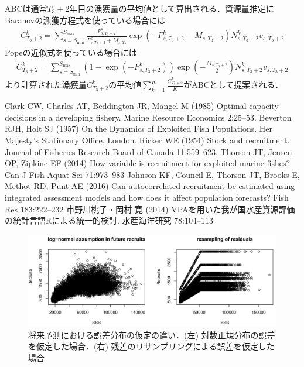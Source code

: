 \documentclass[11pt]{jsarticle}
\begin{document}
ABCは通常$T_{3}+2$年目の漁獲量の平均値として算出される．資源量推定にBaranovの漁獲方程式を使っている場合には
\begin{eqnarray}
  C_{T_3+2}^k=\sum_{s=S_{\mathrm{min}}}^{S_{\mathrm{max}}} \frac{F_{s,T_3+2}^k}{F_{s,T_3+2}^k+M_{s,T_4}}
  \exp(- F_{s,T_3+2}^k-M_{s,T_3+2}) N_{s,T_3+2}^k v_{s,T_3+2}
\end{eqnarray}
Popeの近似式を使っている場合には
\begin{eqnarray}
  C_{T_3+2}^k=\sum_{s=S_{\mathrm{min}}}^{S_{\mathrm{max}}} (1-\exp(- F_{s,T_3+2}^k)) \exp(-\frac{M_{s,T_3+2}}{2}) N_{s,T_3+2}^k v_{s,T_3+2} 
\end{eqnarray}
より計算された漁獲量$C_{T_3+2}^k$の平均値$\sum_{k=1}^K \frac{C_{T_3+2}^k}{K}$がABCとして提案される．

\begin{thebibliography}{9}
   Clark CW, Charles AT, Beddington JR, Mangel M (1985) Optimal capacity decisions in a developing fishery. Marine Resource Economics 2:25--53.
 Beverton RJH, Holt SJ (1957) On the Dynamics of Exploited Fish Populations. Her Majesty’s Stationary Office, London.
 Ricker WE (1954) Stock and recruitment. Journal of Fisheries Research Board of Canada 11:559--623.
 Thorson JT, Jensen OP, Zipkinc EF (2014) How variable is recruitment for exploited marine fishes? Can J Fish Aquat Sci 71:973--983
 Johnson KF, Council E, Thorson JT, Brooks E, Methot RD, Punt AE (2016) Can autocorrelated recruitment be estimated using integrated assessment models and how does it affect population forecasts? Fish Res 183:222--232
 市野川桃子・岡村 寛 (2014) VPAを用いた我が国水産資源評価の統計言語Rによる統一的検討. 水産海洋研究 78:104--113



\end{thebibliography}

\begin{figure}[h]
  \includegraphics[bb=0 0 600 300, width=13cm]{fig_resample.png}
  \caption{将来予測における誤差分布の仮定の違い．(左) 対数正規分布の誤差を仮定した場合．(右) 残差のリサンプリングによる誤差を仮定した場合}
  \label{fig_resample}
\end{figure}
\end{document}
